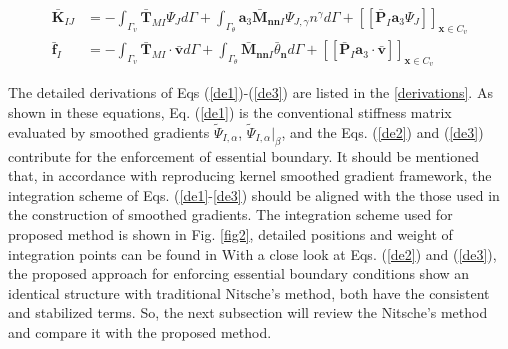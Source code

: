 \begin{subequations}\label{de3}
\begin{align}
\bar{\boldsymbol K}_{IJ} &= - \int_{\Gamma_v} \bar{\boldsymbol T}_{MI} \Psi_J d\Gamma 
+ \int_{\Gamma_\theta} \boldsymbol a_3\bar{\boldsymbol M}_{\boldsymbol{nn}I} \Psi_{J,\gamma}n^\gamma d\Gamma + [[\bar{\boldsymbol P}_I \boldsymbol a_3 \Psi_J]]_{\boldsymbol x \in C_v} \\
\bar{\boldsymbol f}_I &= - \int_{\Gamma_v} \bar{\boldsymbol T}_{MI} \cdot \bar{\boldsymbol v} d\Gamma + \int_{\Gamma_\theta} \bar{\boldsymbol M}_{\boldsymbol{nn} I} \bar{\theta}_{\boldsymbol n} d\Gamma + [[\bar{\boldsymbol P}_I\boldsymbol a_3 \cdot \bar{\boldsymbol v}]]_{\boldsymbol x \in C_v}
\end{align}
\end{subequations}

The detailed derivations of Eqs (\ref{de1})-(\ref{de3}) are listed in the \ref{derivations}. As shown in these equations, Eq. (\ref{de1}) is the conventional stiffness matrix evaluated by smoothed gradients $\tilde \Psi_{I,\alpha}$, $\tilde \Psi_{I,\alpha}\vert_\beta$, and the Eqs. (\ref{de2}) and (\ref{de3}) contribute for the enforcement of essential boundary. It should be mentioned that, in accordance with reproducing kernel smoothed gradient framework, the integration scheme of Eqs. (\ref{de1}-\ref{de3}) should be aligned with the those used in the construction of smoothed gradients. The integration scheme used for proposed method is shown in Fig. \ref{fig2}, \DIFdelbegin {}\DIFdelend \DIFaddbegin {}\DIFaddend detailed positions and weight of integration points \DIFaddbegin {}\DIFaddend can be found in \DIFdelbegin {}\DIFdelend \DIFaddbegin {}\DIFaddend With a close look at Eqs. (\ref{de2}) and (\ref{de3}), the proposed approach for enforcing essential boundary conditions show an identical structure with traditional Nitsche's method, both have the consistent and stabilized terms. So, the next subsection will review the Nitsche's method and compare it with the proposed method.

